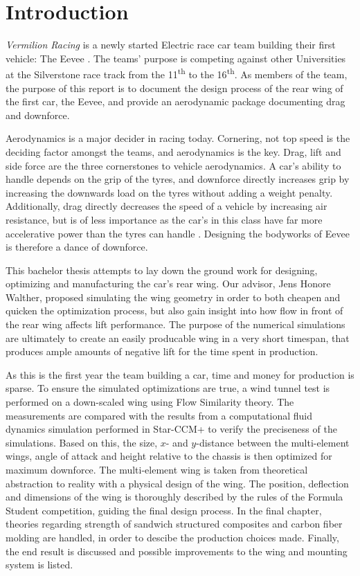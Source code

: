 \chapter{Introduction}
  \emph{Vermilion Racing} is a newly started Electric race car team building their first vehicle: The Eevee \cite{bulba}. The teams' purpose is competing against other Universities at the Silverstone race track from the 11\textsuperscript{th} to the 16\textsuperscript{th}. As members of the team, the purpose of this report is to document the design process of the rear wing of the first car, the Eevee, and provide an aerodynamic package documenting drag and downforce.

  Aerodynamics is a major decider in racing today. Cornering, not top speed is the deciding factor amongst the teams, and aerodynamics is the key. Drag, lift and side force are the three cornerstones to vehicle aerodynamics. A car's ability to handle depends on the grip of the tyres, and downforce directly increases grip by increasing the downwards load on the tyres without adding a weight penalty. Additionally, drag directly decreases the speed of a vehicle by increasing air resistance, but is of less importance as the car's in this class have far more accelerative power than the tyres can handle \cite{jkatz}. Designing the bodyworks of Eevee is therefore a dance of downforce.

  This bachelor thesis attempts to lay down the ground work for designing, optimizing and manufacturing the car's rear wing. Our advisor, Jens Honore Walther, proposed simulating the wing geometry in order to both cheapen and quicken the optimization process, but also gain insight into how flow in front of the rear wing affects lift performance. The purpose of the numerical simulations are ultimately to create an easily producable wing in a very short timespan, that produces ample amounts of negative lift for the time spent in production. 

  As this is the first year the team building a car, time and money for production is sparse. To ensure the simulated optimizations are true, a wind tunnel test is performed on a down-scaled wing using Flow Similarity theory. The measurements are compared with the results from a computational fluid dynamics simulation performed in Star-CCM+ to verify the preciseness of the simulations. Based on this, the size, $x$- and $y$-distance between the multi-element wings, angle of attack and height relative to the chassis is then optimized for maximum downforce. The multi-element wing is taken from theoretical abstraction to reality with a physical design of the wing. The position, deflection and dimensions of the wing is thoroughly described by the rules of the Formula Student competition, guiding the final design process. In the final chapter, theories regarding strength of sandwich structured composites and carbon fiber molding are handled, in order to descibe the production choices made. Finally, the end result is discussed and possible improvements to the wing and mounting system is listed.

